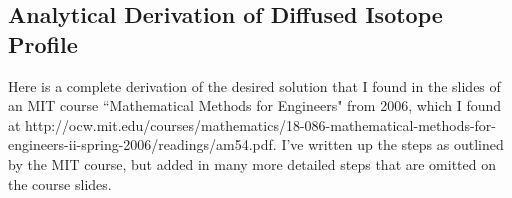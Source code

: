 \documentclass[draft, jgrga]{AGUTeX}
\begin{document}
\begin{article}



\appendix

\section{Analytical Derivation of Diffused Isotope Profile}

Here is a complete derivation of the desired solution that I found in the slides of an MIT course ``Mathematical Methods for Engineers" from 2006, which I found at http://ocw.mit.edu/courses/mathematics/18-086-mathematical-methods-for-engineers-ii-spring-2006/readings/am54.pdf. I've written up the steps as outlined by the MIT course, but added in many more detailed steps that are omitted on the course slides.\\


\end{article}
\end{document}

